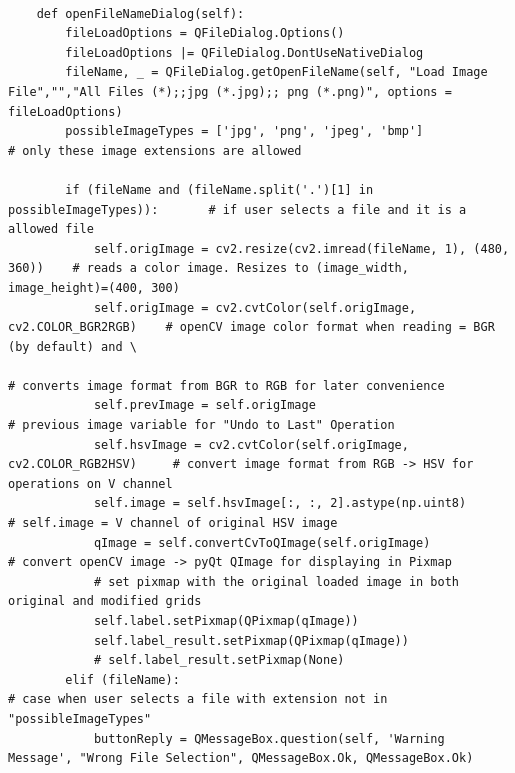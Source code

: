 \documentclass[letterpaper, 10 pt, conference]{ieeeconf}  %
\begin{document}
\begin{mdframed}
\begin{lstlisting}
    
    def openFileNameDialog(self):
        fileLoadOptions = QFileDialog.Options()
        fileLoadOptions |= QFileDialog.DontUseNativeDialog
        fileName, _ = QFileDialog.getOpenFileName(self, "Load Image File","","All Files (*);;jpg (*.jpg);; png (*.png)", options = fileLoadOptions)
        possibleImageTypes = ['jpg', 'png', 'jpeg', 'bmp']                             # only these image extensions are allowed

        if (fileName and (fileName.split('.')[1] in possibleImageTypes)):       # if user selects a file and it is a allowed file
            self.origImage = cv2.resize(cv2.imread(fileName, 1), (480, 360))    # reads a color image. Resizes to (image_width, image_height)=(400, 300)
            self.origImage = cv2.cvtColor(self.origImage, cv2.COLOR_BGR2RGB)    # openCV image color format when reading = BGR (by default) and \
                                                                                # converts image format from BGR to RGB for later convenience
            self.prevImage = self.origImage                                     # previous image variable for "Undo to Last" Operation
            self.hsvImage = cv2.cvtColor(self.origImage, cv2.COLOR_RGB2HSV)     # convert image format from RGB -> HSV for operations on V channel
            self.image = self.hsvImage[:, :, 2].astype(np.uint8)                # self.image = V channel of original HSV image
            qImage = self.convertCvToQImage(self.origImage)                     # convert openCV image -> pyQt QImage for displaying in Pixmap
            # set pixmap with the original loaded image in both original and modified grids
            self.label.setPixmap(QPixmap(qImage))
            self.label_result.setPixmap(QPixmap(qImage))
            # self.label_result.setPixmap(None)
        elif (fileName):                                                        # case when user selects a file with extension not in "possibleImageTypes"
            buttonReply = QMessageBox.question(self, 'Warning Message', "Wrong File Selection", QMessageBox.Ok, QMessageBox.Ok)



\end{lstlisting}
\end{mdframed}
\end{document}
